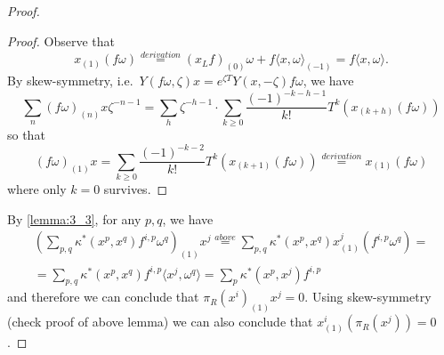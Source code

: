 \documentclass[a4paper, 10pt]{article}
\begin{document}
\begin{proof}
\begin{proof}
                    Observe that \[x_{(1)}(f\omega) \stackrel{derivation}{=} (x_Lf)_{(0)}\omega + f\langle x, \omega \rangle_{(-1)} = f\langle x, \omega\rangle.  \] By skew-symmetry, i.e.\ $Y(f\omega, \zeta)x = e^{\zeta T}Y(x, -\zeta)f\omega$, we have \[\sum_n (f\omega)_{(n)}x \zeta^{-n-1} = \sum_h \zeta^{-h-1} \cdot \sum_{k \geq 0} \frac{(-1)^{-k-h-1}}{k!}T^k(x_{(k+h)}(f\omega)) \] so that \[(f\omega)_{(1)}x = \sum_{k \geq 0} \frac{(-1)^{-k-2}}{k!} T^k(x_{(k+1)}(f\omega)) \stackrel{derivation}{=} x_{(1)}(f\omega) \] where only $k=0$ survives.
                \end{proof}
                By \cref{lemma:3_3}, for any $p, q$, we have 
                \begin{gather*}
                    \left(\sum_{p,q} \kappa^*(x^p, x^q)f^{i,p}\omega^q\right)_{(1)}x^j \stackrel{above}{=} \sum_{p,q}\kappa^*(x^p, x^q)x^j_{(1)}(f^{i,p}\omega^q) =\\= \sum_{p,q} \kappa^*(x^p, x^q)f^{i,p}\langle x^j, \omega^q \rangle = \sum_p \kappa^*(x^p, x^j)f^{i,p}  
                \end{gather*}
                and therefore we can conclude that $\pi_R(x^i)_{(1)}x^j = 0$. Using skew-symmetry (check proof of above lemma) we can also conclude that $x^i_{(1)}(\pi_R(x^j)) = 0$.


\end{proof}
\end{document}
